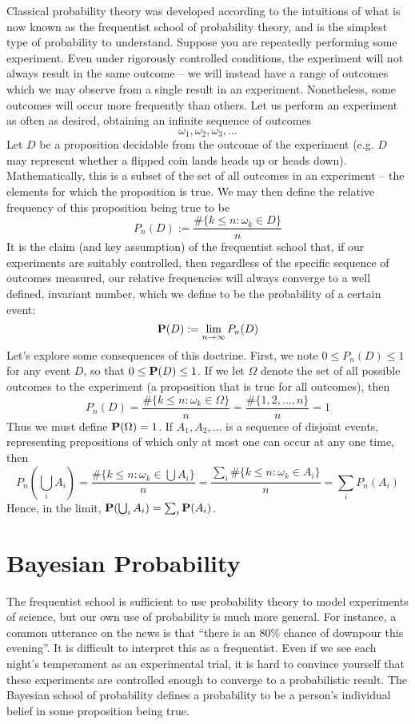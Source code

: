 Classical probability theory was developed according to the intuitions of what is now known as the frequentist school of probability theory, and is the simplest type of probability to understand. Suppose you are repeatedly performing some experiment. Even under rigorously controlled conditions, the experiment will not always result in the same outcome -- we will instead have a range of outcomes which we may observe from a single result in an experiment. Nonetheless, some outcomes will occur more frequently than others. Let us perform an experiment as often as desired, obtaining an infinite sequence of outcomes
%
\[ \omega_1, \omega_2, \omega_3, \dots \]
%
Let $D$ be a proposition decidable from the outcome of the experiment (e.g. $D$ may represent whether a flipped coin lands heads up or heads down). Mathematically, this is a subset of the set of all outcomes in an experiment -- the elements for which the proposition is true. We may then define the relative frequency of this proposition being true to be
%
\[ P_n(D) := \frac{\# \{ k \leq n : \omega_k \in D \}}{n} \]
%
It is the claim (and key assumption) of the frequentist school that, if our experiments are suitably controlled, then regardless of the specific sequence of outcomes measured, our relative frequencies will always converge to a well defined, invariant number, which we define to be the probability of a certain event:
%
\[ \operatorname{\mathbf{P}}(D) := \lim_{n \to \infty} P_n(D) \]
%
Let's explore some consequences of this doctrine. First, we note $0 \leq P_n(D) \leq 1$ for any event $D$, so that $0 \leq \operatorname{\mathbf{P}}(D) \leq 1$. If we let $\Omega$ denote the set of all possible outcomes to the experiment (a proposition that is true for all outcomes), then
%
\[ P_n(D) = \frac{\# \{ k \leq n : \omega_k \in \Omega\}}{n} = \frac{\# \{ 1, 2, \dots, n \}}{n} = 1 \]
%
Thus we must define $\operatorname{\mathbf{P}}(\Omega) = 1$. If $A_1, A_2, \dots$ is a sequence of disjoint events, representing prepositions of which only at most one can occur at any one time, then
%
\[ P_n \left( \bigcup_i A_i \right) = \frac{\# \{ k \leq n : \omega_k \in \bigcup A_i \}}{n} = \frac{\sum_i \# \{ k \leq n : \omega_k \in A_i \}}{n} = \sum_i P_n(A_i) \]
%
Hence, in the limit, $\operatorname{\mathbf{P}}(\bigcup_i A_i) = \sum_i \operatorname{\mathbf{P}}(A_i)$.



\section{Bayesian Probability}

The frequentist school is sufficient to use probability theory to model experiments of science, but our own use of probability is much more general. For instance, a common utterance on the news is that ``there is an 80\% chance of downpour this evening''. It is difficult to interpret this as a frequentist. Even if we see each night's temperament as an experimental trial, it is hard to convince yourself that these experiments are controlled enough to converge to a probabilistic result. The Bayesian school of probability defines a probability to be a person's individual belief in some proposition being true.

